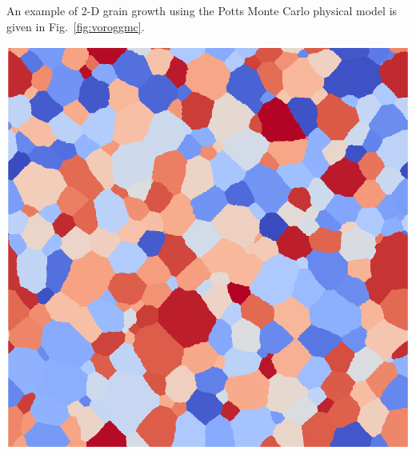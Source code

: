 \documentclass[11pt]{article}
\begin{document}
\begin{multicols*}{2}
An example of 2-D grain growth using the Potts Monte Carlo physical model is given in Fig.~\ref{fig:voroggmc}.

\begin{center}\begin{minipage}{0.45\textwidth}\centering
  \includegraphics[width=\textwidth]{graingrowth-mc}
\end{minipage}\end{center}



\end{multicols*}
\end{document}
